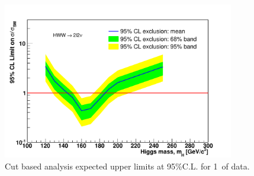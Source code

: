

\begin{figure}[!htbp]
\begin{center}
   \includegraphics[width=0.9\textwidth]{figures/cut_based_limits.pdf}
   \caption{Cut based analysis expected upper limits at 95\%C.L. for 1\ifb\ of data.}
   \label{fig:cutbase_uls}
\end{center}
\end{figure}
